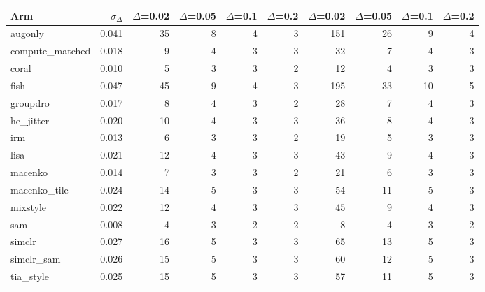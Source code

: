 \begin{tabular}{lrrrrrrrrr}
\toprule
Arm & $\sigma_\Delta$ & $\Delta$=0.02 & $\Delta$=0.05 & $\Delta$=0.1 & $\Delta$=0.2 & $\Delta$=0.02 & $\Delta$=0.05 & $\Delta$=0.1 & $\Delta$=0.2 \\
\midrule
augonly & 0.041 & 35 & 8 & 4 & 3 & 151 & 26 & 9 & 4 \\
compute\_matched & 0.018 & 9 & 4 & 3 & 3 & 32 & 7 & 4 & 3 \\
coral & 0.010 & 5 & 3 & 3 & 2 & 12 & 4 & 3 & 3 \\
fish & 0.047 & 45 & 9 & 4 & 3 & 195 & 33 & 10 & 5 \\
groupdro & 0.017 & 8 & 4 & 3 & 2 & 28 & 7 & 4 & 3 \\
he\_jitter & 0.020 & 10 & 4 & 3 & 3 & 36 & 8 & 4 & 3 \\
irm & 0.013 & 6 & 3 & 3 & 2 & 19 & 5 & 3 & 3 \\
lisa & 0.021 & 12 & 4 & 3 & 3 & 43 & 9 & 4 & 3 \\
macenko & 0.014 & 7 & 3 & 3 & 2 & 21 & 6 & 3 & 3 \\
macenko\_tile & 0.024 & 14 & 5 & 3 & 3 & 54 & 11 & 5 & 3 \\
mixstyle & 0.022 & 12 & 4 & 3 & 3 & 45 & 9 & 4 & 3 \\
sam & 0.008 & 4 & 3 & 2 & 2 & 8 & 4 & 3 & 2 \\
simclr & 0.027 & 16 & 5 & 3 & 3 & 65 & 13 & 5 & 3 \\
simclr\_sam & 0.026 & 15 & 5 & 3 & 3 & 60 & 12 & 5 & 3 \\
tia\_style & 0.025 & 15 & 5 & 3 & 3 & 57 & 11 & 5 & 3 \\
\bottomrule
\end{tabular}
